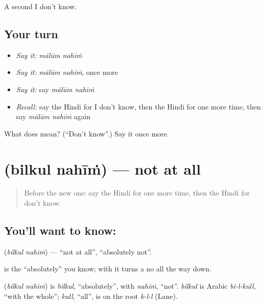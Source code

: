\begin{grammarlens}[title={What you've built}]
A second I don't know.
\end{grammarlens}

\subsection*{Your turn}
\begin{itemize}
\raggedright
  \item \emph{Say it:} \emph{mālūm nahīṁ}
  \item \emph{Say it:} \emph{mālūm nahīṁ}, once more
  \item \emph{Say it:} say \emph{mālūm nahīṁ}
  \item \emph{Recall:} say the Hindi for I don't know, then the Hindi for one more time, then say \emph{mālūm nahīṁ} again
\end{itemize}

\begin{tcolorbox}[breakable,colback=teal!4,colframe=teal!35!black,title={Before you move on}]
What does   mean? (\textquotedblleft{}Don't know\textquotedblright{}.) Say it once more.
\end{tcolorbox}
\section[\texorpdfstring{\hi{बिलकुल} \hi{नहीं} (bilkul nahīṁ)}{बिलकुल नहीं (bilkul nahīṁ)}]{  (bilkul nahīṁ) — not at all}

\label{lesson:HI-C127-bilkulnahin}



\begin{quote}
Before the new one: say the Hindi for one more time, then the Hindi for don't know.
\end{quote}

\subsection*{You'll want to know:  }
\textbf{ } (\emph{bilkul nahīṁ}) — \textquotedblleft{}not at all\textquotedblright{}, \textquotedblleft{}absolutely not\textquotedblright{}.

\textbf{} is the \textquotedblleft{}absolutely\textquotedblright{} you know; with \textbf{} it turns a no all the way down.

\begin{cousinweb}
\textbf{ } (\emph{bilkul nahīṁ}) is \emph{bilkul}, \textquotedblleft{}absolutely\textquotedblright{}, with \emph{nahīṁ}, \textquotedblleft{}not\textquotedblright{}. \emph{bilkul} is Arabic \emph{bi-l-kull}, \textquotedblleft{}with the whole\textquotedblright{}; \emph{kull}, \textquotedblleft{}all\textquotedblright{}, is on the root \emph{k-l-l} (Lane).
\end{cousinweb}

